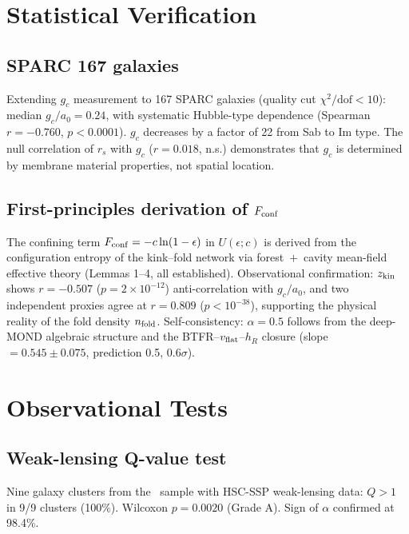 \documentclass[11pt,a4paper]{article}
\newcommand{\e}[1]{\times 10^{#1}}
\newcommand{\gc}{g_{c}}
\newcommand{\ao}{a_{0}}
\newcommand{\vflat}{v_{\rm flat}}
\newcommand{\hR}{h_{R}}
\newcommand{\chisq}{\chi^{2}}
\begin{document}
\section{Statistical Verification}

\subsection{SPARC 167 galaxies}
Extending $\gc$ measurement to 167 SPARC galaxies (quality cut $\chisq/\text{dof} < 10$):
median $\gc/\ao = 0.24$, with systematic Hubble-type dependence (Spearman $r = -0.760$, $p < 0.0001$).
$\gc$ decreases by a factor of 22 from Sab to Im type. The null correlation of $r_s$ with $\gc$
($r = 0.018$, n.s.) demonstrates that $\gc$ is determined by membrane material properties, not spatial
location.

\subsection{First-principles derivation of $F_{\rm conf}$}
The confining term $F_{\rm conf} = -c\ln(1 - \epsilon)$ in $U(\epsilon; c)$ is derived from the configuration
entropy of the kink--fold network via forest~$+$~cavity mean-field effective theory (Lemmas 1--4, all
established). Observational confirmation: $z_{\rm kin}$ shows $r = -0.507$ ($p = 2 \e{-12}$) anti-correlation
with $\gc/\ao$, and two independent proxies agree at $r = 0.809$ ($p < 10^{-38}$), supporting the physical
reality of the fold density $n_{\rm fold}$. Self-consistency: $\alpha = 0.5$ follows from the deep-MOND
algebraic structure and the BTFR--$\vflat$--$\hR$ closure (slope $= 0.545 \pm 0.075$, prediction 0.5,
$0.6\sigma$).

\section{Observational Tests}

\subsection{Weak-lensing Q-value test}
Nine galaxy clusters from the~\citet{Miyaoka2019} sample with HSC-SSP weak-lensing data: $Q > 1$ in 9/9
clusters (100\%). Wilcoxon $p = 0.0020$ (Grade A). Sign of $\alpha$ confirmed at 98.4\%.
\end{document}
